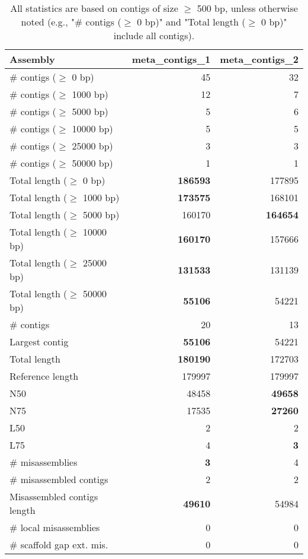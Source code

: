 \documentclass[12pt,a4paper]{article}
\begin{document}
\begin{table}[ht]
\begin{center}
\caption{All statistics are based on contigs of size $\geq$ 500 bp, unless otherwise noted (e.g., "\# contigs ($\geq$ 0 bp)" and "Total length ($\geq$ 0 bp)" include all contigs).}
\begin{tabular}{|l*{2}{|r}|}
\hline
Assembly & meta\_contigs\_1 & meta\_contigs\_2 \\ \hline
\# contigs ($\geq$ 0 bp) & 45 & 32 \\ \hline
\# contigs ($\geq$ 1000 bp) & 12 & 7 \\ \hline
\# contigs ($\geq$ 5000 bp) & 5 & 6 \\ \hline
\# contigs ($\geq$ 10000 bp) & 5 & 5 \\ \hline
\# contigs ($\geq$ 25000 bp) & 3 & 3 \\ \hline
\# contigs ($\geq$ 50000 bp) & 1 & 1 \\ \hline
Total length ($\geq$ 0 bp) & {\bf 186593} & 177895 \\ \hline
Total length ($\geq$ 1000 bp) & {\bf 173575} & 168101 \\ \hline
Total length ($\geq$ 5000 bp) & 160170 & {\bf 164654} \\ \hline
Total length ($\geq$ 10000 bp) & {\bf 160170} & 157666 \\ \hline
Total length ($\geq$ 25000 bp) & {\bf 131533} & 131139 \\ \hline
Total length ($\geq$ 50000 bp) & {\bf 55106} & 54221 \\ \hline
\# contigs & 20 & 13 \\ \hline
Largest contig & {\bf 55106} & 54221 \\ \hline
Total length & {\bf 180190} & 172703 \\ \hline
Reference length & 179997 & 179997 \\ \hline
N50 & 48458 & {\bf 49658} \\ \hline
N75 & 17535 & {\bf 27260} \\ \hline
L50 & 2 & 2 \\ \hline
L75 & 4 & {\bf 3} \\ \hline
\# misassemblies & {\bf 3} & 4 \\ \hline
\# misassembled contigs & 2 & 2 \\ \hline
Misassembled contigs length & {\bf 49610} & 54984 \\ \hline
\# local misassemblies & 0 & 0 \\ \hline
\# scaffold gap ext. mis. & 0 & 0 \\ \hline

\end{tabular}
\end{center}
\end{table}
\end{document}
